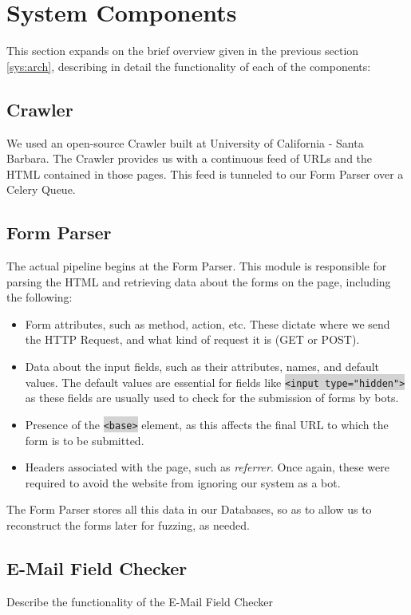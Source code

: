 \section{System Components}
\label{Comp}

This section expands on the brief overview given in the previous section \ref{sys:arch}, describing in detail the functionality of each of the components:

\subsection{Crawler}
	\label{Comp:Crawler}
	We used an open-source Crawler built at University of California - Santa Barbara. The Crawler provides us with a continuous feed of URLs and the HTML contained in those pages. This feed is tunneled to our Form Parser over a Celery Queue.
	
\subsection{Form Parser}
	\label{Comp:FP}
	The actual pipeline begins at the Form Parser. This module is responsible for parsing the HTML and retrieving data about the forms on the page, including the following:
	\begin{itemize}
		\item Form attributes, such as method, action, etc. These dictate where we send the HTTP Request, and what kind of request it is (GET or POST).
		\item Data about the input fields, such as their attributes, names, and default values. The default values are essential for fields like \colorbox{lightgray}{\lstinline{<input type="hidden">}} as these fields are usually used to check for the submission of forms by bots.
		\item Presence of the \colorbox{lightgray}{\lstinline{<base>}} element, as this affects the final URL to which the form is to be submitted.
		\item Headers associated with the page, such as \emph{referrer}. Once again, these were required to avoid the website from ignoring our system as a bot.
	\end{itemize} 
	The Form Parser stores all this data in our Databases, so as to allow us to reconstruct the forms later for fuzzing, as needed.

\subsection{E-Mail Field Checker}
	\label{Comp:EMFC}
	Describe the functionality of the E-Mail Field Checker

